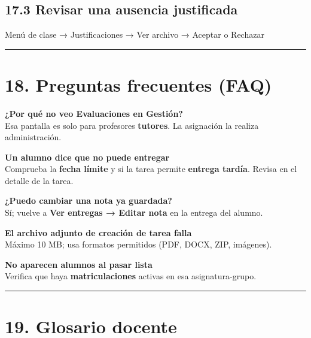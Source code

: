 \documentclass[
  spanish,
  11pt,
]{report}
\newenvironment{Shaded}{}{}
\newcommand{\NormalTok}[1]{#1}
\begin{document}
\subsection{17.3 Revisar una ausencia
justificada}\label{revisar-una-ausencia-justificada}

\begin{Shaded}
\begin{Highlighting}[]
\NormalTok{Menú de clase → Justificaciones → Ver archivo → Aceptar o Rechazar}
\end{Highlighting}
\end{Shaded}

\begin{center}\rule{0.5\linewidth}{0.5pt}\end{center}

\section{18. Preguntas frecuentes
(FAQ)}\label{preguntas-frecuentes-faq-1}

\textbf{¿Por qué no veo Evaluaciones en Gestión?}\\
Esa pantalla es solo para profesores \textbf{tutores}. La asignación la
realiza administración.

\textbf{Un alumno dice que no puede entregar}\\
Comprueba la \textbf{fecha límite} y si la tarea permite \textbf{entrega
tardía}. Revisa en el detalle de la tarea.

\textbf{¿Puedo cambiar una nota ya guardada?}\\
Sí; vuelve a \textbf{Ver entregas → Editar nota} en la entrega del
alumno.

\textbf{El archivo adjunto de creación de tarea falla}\\
Máximo 10 MB; usa formatos permitidos (PDF, DOCX, ZIP, imágenes).

\textbf{No aparecen alumnos al pasar lista}\\
Verifica que haya \textbf{matriculaciones} activas en esa
asignatura-grupo.

\begin{center}\rule{0.5\linewidth}{0.5pt}\end{center}

\section{19. Glosario docente}\label{glosario-docente}
\end{document}
